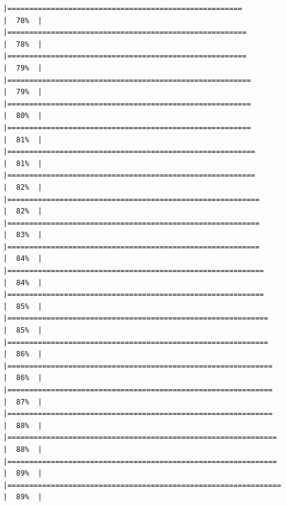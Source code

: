 \documentclass[
  english,
  man,a4paper,mask,floatsintext]{apa6}
\begin{document}
\begin{verbatim}
|======================================================                |  78%  |                                                                              |=======================================================               |  78%  |                                                                              |=======================================================               |  79%  |                                                                              |========================================================              |  79%  |                                                                              |========================================================              |  80%  |                                                                              |========================================================              |  81%  |                                                                              |=========================================================             |  81%  |                                                                              |=========================================================             |  82%  |                                                                              |==========================================================            |  82%  |                                                                              |==========================================================            |  83%  |                                                                              |==========================================================            |  84%  |                                                                              |===========================================================           |  84%  |                                                                              |===========================================================           |  85%  |                                                                              |============================================================          |  85%  |                                                                              |============================================================          |  86%  |                                                                              |=============================================================         |  86%  |                                                                              |=============================================================         |  87%  |                                                                              |=============================================================         |  88%  |                                                                              |==============================================================        |  88%  |                                                                              |==============================================================        |  89%  |                                                                              |===============================================================       |  89%  |                                                                              
\end{verbatim}
\end{document}
